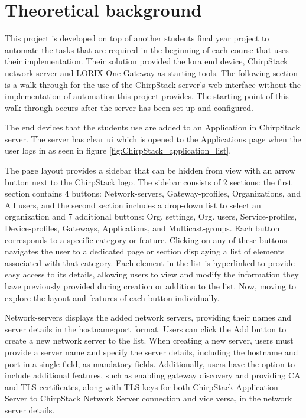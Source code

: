 
\chapter{Theoretical background} \label{ch:theor_backgr}

This project is developed on top of another students final year project \cite{theseus:gere-zoltan} to automate the tasks that are required in the beginning of each course that uses their implementation.
Their solution provided the \gls{lora} end device, ChirpStack network server and LORIX One Gateway as starting tools.
The following section is a walk-through for the use of the ChirpStack server's web-interface without the implementation of automation this project provides.
The starting point of this walk-through occurs after the server has been set up and configured.

The end devices that the students use are added to an Application in ChirpStack server.
The server has clear \gls{ui} which is opened to the Applications page when the user logs in as seen in figure \ref{fig:ChirpStack_application_list}.

The page layout provides a sidebar that can be hidden from view with an arrow button next to the ChirpStack logo.
The sidebar consists of 2 sections: the first section contains 4 buttons: Network-servers, Gateway-profiles, Organizations, and All users, and the second section includes a drop-down list to select an organization and 7 additional buttons: Org. settings, Org. users, Service-profiles, Device-profiles, Gateways, Applications, and Multicast-groups.
Each button corresponds to a specific category or feature.
Clicking on any of these buttons navigates the user to a dedicated page or section displaying a list of elements associated with that category.
Each element in the list is hyperlinked to provide easy access to its details, allowing users to view and modify the information they have previously provided during creation or addition to the list.
Now, moving to explore the layout and features of each button individually.

Network-servers displays the added network servers, providing their names and server details in the hostname:port format.
Users can click the Add button to create a new network server to the list.
When creating a new server, users must provide a server name and specify the server details, including the hostname and port in a single field, as mandatory fields.
Additionally, users have the option to include additional features, such as enabling gateway discovery and providing CA and TLS certificates, along with TLS keys for both ChirpStack Application Server to ChirpStack Network Server connection and vice versa, in the network server details.

